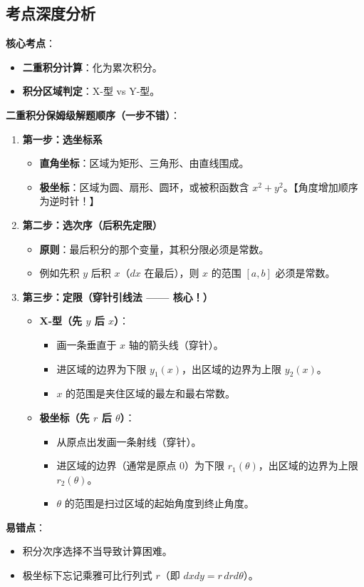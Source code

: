 \documentclass[UTF8,10pt]{ctexart}
\newenvironment{redenv}{\color{red}}{}
\newenvironment{conceptbox}{%
    \begin{tcolorbox}[colback=red!5, colframe=red!50!black, title=概念解析, fonttitle=\bfseries, top=2pt, bottom=2pt, left=2pt, right=2pt]
}{%
    \end{tcolorbox}
}
\begin{document}
\begin{redenv}
\subsection*{考点深度分析}
\begin{conceptbox}
\textbf{核心考点}：
\begin{itemize}
    \item \textbf{二重积分计算}：化为累次积分。
    \item \textbf{积分区域判定}：X-型 vs Y-型。
\end{itemize}
\textbf{二重积分保姆级解题顺序（一步不错）}：
\begin{enumerate}
    \item \textbf{第一步：选坐标系}
    \begin{itemize}
        \item \textbf{直角坐标}：区域为矩形、三角形、由直线围成。
        \item \textbf{极坐标}：区域为圆、扇形、圆环，或被积函数含 $x^2+y^2$。【角度增加顺序为逆时针！】
    \end{itemize}
    \item \textbf{第二步：选次序（后积先定限）}
    \begin{itemize}
        \item \textbf{原则}：最后积分的那个变量，其积分限必须是常数。
        \item 例如先积 $y$ 后积 $x$（$dx$ 在最后），则 $x$ 的范围 $[a, b]$ 必须是常数。
    \end{itemize}
    \item \textbf{第三步：定限（穿针引线法 —— 核心！）}
    \begin{itemize}
        \item \textbf{X-型（先 $y$ 后 $x$）}：
        \begin{itemize}
            \item 画一条垂直于 $x$ 轴的箭头线（穿针）。
            \item 进区域的边界为下限 $y_1(x)$，出区域的边界为上限 $y_2(x)$。
            \item $x$ 的范围是夹住区域的最左和最右常数。
        \end{itemize}
        \item \textbf{极坐标（先 $r$ 后 $\theta$）}：
        \begin{itemize}
            \item 从原点出发画一条射线（穿针）。
            \item 进区域的边界（通常是原点 $0$）为下限 $r_1(\theta)$，出区域的边界为上限 $r_2(\theta)$。
            \item $\theta$ 的范围是扫过区域的起始角度到终止角度。
        \end{itemize}
    \end{itemize}
\end{enumerate}
\textbf{易错点}：
\begin{itemize}
    \item 积分次序选择不当导致计算困难。
    \item 极坐标下忘记乘雅可比行列式 $r$（即 $dxdy = r\, dr d\theta$）。
\end{itemize}
\end{conceptbox}
\end{redenv}
\end{document}
